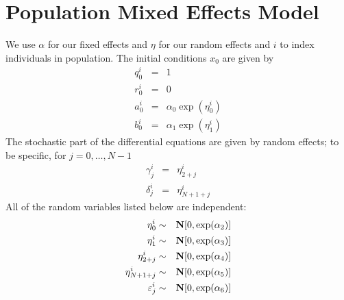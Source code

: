 \documentclass{article}
\newcommand{\BN}{{\bf N}}
\begin{document}
\section{Population Mixed Effects Model}
We use \( \alpha \) for our fixed effects and \( \eta \)
for our random effects and \( i \) to index individuals in population.
The initial conditions \( x_0 \) are given by
\begin{eqnarray*}
q^i_0 & = & 1
\\
r^i_0 & = & 0
\\
a^i_0 & = & \alpha_0 \exp ( \eta^i_0 )
\\
b^i_0 & = & \alpha_1 \exp ( \eta^i_1 )
\end{eqnarray*}
The stochastic part of the differential equations are
given by random effects; to be specific, for \( j = 0 , \ldots , N-1 \)
\begin{eqnarray*}
\gamma^i_j & = & \eta^i_{2 + j}
\\
\delta^i_j & = & \eta^i_{N+1+j}
\end{eqnarray*}
All of the random variables listed below are independent:
\begin{eqnarray*}
\eta^i_0 & \sim & \BN [ 0, \exp( \alpha_2 ) ] 
\\
\eta^i_1 & \sim & \BN [ 0, \exp( \alpha_3 ) ] 
\\
\eta^i_{2+j} & \sim & \BN [ 0, \exp( \alpha_4 ) ] 
\\
\eta^i_{N+1+j} & \sim & \BN [ 0, \exp( \alpha_5 ) ] 
\\
\varepsilon^i_j & \sim & \BN [ 0 , \exp( \alpha_6 ) ]
\end{eqnarray*}
\end{document}
